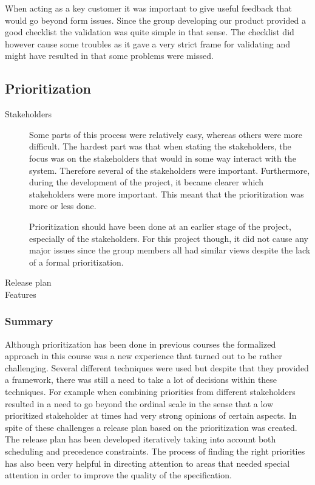 \documentclass[10pt,a4paper]{article}
\begin{document}
When acting as a key customer it was important to give useful feedback that would go beyond form issues. Since the group developing our product provided a good checklist the validation was quite simple in that sense. The checklist did however cause some troubles as it gave a very strict frame for validating and might have resulted in that some problems were missed.


\subsection{Prioritization}
\begin{description}
\item[Stakeholders] Some parts of this process were relatively easy, whereas others were more difficult. The hardest part was that when stating the stakeholders, the focus was on the stakeholders that would in some way interact with the system. Therefore several of the stakeholders were important. Furthermore, during the development of the project, it became clearer which stakeholders were more important. This meant that the prioritization was more or less done. 

Prioritization should have been done at an earlier stage of the project, especially of the stakeholders. For this project though, it did not cause any major issues since the group members all had similar views despite the lack of a formal prioritization. 

\item[Release plan]

\item[Features]
\end{description}
\subsubsection*{Summary} Although prioritization has been done in previous courses the formalized approach in this course was  a new experience that turned out to be rather challenging. Several different techniques were used but despite that they provided a framework, there was still a need to take a lot of decisions within these techniques. For example when combining priorities from different stakeholders resulted in a need to go beyond the ordinal scale in the sense that a low prioritized stakeholder at times had very strong opinions of certain aspects. In spite of these challenges a release plan based on the prioritization was created. The release plan has been developed iteratively taking into account both scheduling and precedence constraints. The process of finding the right priorities has also been very helpful in directing attention to areas that needed special attention in order to improve the quality of the specification. 
\end{document}
